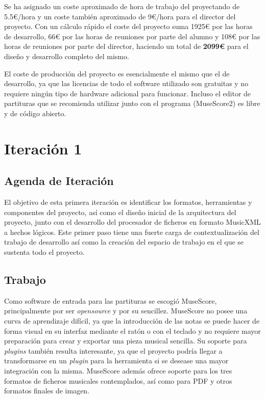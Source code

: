 Se ha asignado un coste aproximado de hora de trabajo del proyectando de 5.5\euro{}/hora y un coste también aproximado de 9\euro{}/hora para el director del proyecto. Con un cálculo rápido el coste del proyecto suma 1925\euro{} por las horas de desarrollo, 66\euro{} por las horas de reuniones por parte del alumno y 108\euro{} por las horas de reuniones por parte del director, haciendo un total de \textbf{2099\euro{}} para el diseño y desarrollo completo del mismo.

El coste de producción del proyecto es esencialmente el mismo que el de desarrollo, ya que las licencias de todo el software utilizado son gratuitas y no requiere ningún tipo de hardware adicional para funcionar. Incluso el editor de partituras que se recomienda utilizar junto con el programa (MuseScore2) es libre y de código abierto.

\section{Iteración 1}
\subsection{Agenda de Iteración}
El objetivo de esta primera iteración es identificar los formatos, herramientas y componentes del proyecto, así como el diseño inicial de la arquitectura del proyecto, junto con el desarrollo del procesador de ficheros en formato MusicXML a hechos lógicos. Este primer paso tiene una fuerte carga de contextualización del trabajo de desarrollo así como la creación del espacio de trabajo en el que se sustenta todo el proyecto.

\subsection{Trabajo}
Como software de entrada para las partituras se escogió MuseScore, principalmente por ser \textit{opensource} y por su sencillez. MuseScore no posee una curva de aprendizaje difícil, ya que la introducción de las notas se puede hacer de forma visual en su interfaz mediante el ratón o con el teclado y no requiere mayor preparación para crear y exportar una pieza musical sencilla. Su soporte para \textit{plugins} también resulta interesante, ya que el proyecto podría llegar a transformarse en un \textit{plugin} para la herramienta si se desease una mayor integración con la misma. MuseScore además ofrece soporte para los tres formatos de ficheros musicales contemplados, así como para PDF y otros formatos finales de imagen.

